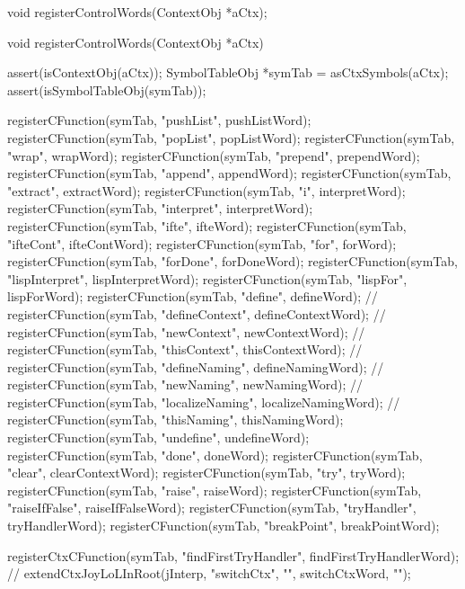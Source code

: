 \startTestSuite[registerControlWords]

\startCHeader
void registerControlWords(ContextObj *aCtx);
\stopCHeader

\startCCode
void registerControlWords(ContextObj *aCtx) {
  assert(isContextObj(aCtx));
  SymbolTableObj *symTab = asCtxSymbols(aCtx);
  assert(isSymbolTableObj(symTab));
 
  registerCFunction(symTab, "pushList",       pushListWord);
  registerCFunction(symTab, "popList",        popListWord);
  registerCFunction(symTab, "wrap",           wrapWord);
  registerCFunction(symTab, "prepend",        prependWord);
  registerCFunction(symTab, "append",         appendWord);
  registerCFunction(symTab, "extract",        extractWord);
  registerCFunction(symTab, "i",              interpretWord);
  registerCFunction(symTab, "interpret",      interpretWord);
  registerCFunction(symTab, "ifte",           ifteWord);
  registerCFunction(symTab, "ifteCont",       ifteContWord);
  registerCFunction(symTab, "for",            forWord);
  registerCFunction(symTab, "forDone",        forDoneWord);
  registerCFunction(symTab, "lispInterpret",  lispInterpretWord);
  registerCFunction(symTab, "lispFor",        lispForWord);
  registerCFunction(symTab, "define",         defineWord);
//  registerCFunction(symTab, "defineContext",  defineContextWord);
//  registerCFunction(symTab, "newContext",     newContextWord);
//  registerCFunction(symTab, "thisContext",    thisContextWord);
//  registerCFunction(symTab, "defineNaming",   defineNamingWord);
//  registerCFunction(symTab, "newNaming",      newNamingWord);
//  registerCFunction(symTab, "localizeNaming", localizeNamingWord);
//  registerCFunction(symTab, "thisNaming",     thisNamingWord);
  registerCFunction(symTab, "undefine",       undefineWord);
  registerCFunction(symTab, "done",           doneWord);
  registerCFunction(symTab, "clear",          clearContextWord);
  registerCFunction(symTab, "try",            tryWord);
  registerCFunction(symTab, "raise",          raiseWord);
  registerCFunction(symTab, "raiseIfFalse",   raiseIfFalseWord);
  registerCFunction(symTab, "tryHandler",     tryHandlerWord);
  registerCFunction(symTab, "breakPoint",     breakPointWord);
  
  registerCtxCFunction(symTab, "findFirstTryHandler", findFirstTryHandlerWord);
//  extendCtxJoyLoLInRoot(jInterp, "switchCtx",           "", switchCtxWord,           "");
}
\stopCCode


